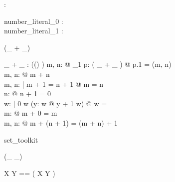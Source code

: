 \begin{axdef}
\nat : \power \arithmos
\end{axdef}

\begin{axdef}
  number\_literal\_0 : \nat\\
  number\_literal\_1 : \nat
\end{axdef}

\begin{zed}
 \leftassoc (\_ + \_)
\end{zed}

\begin{axdef}
\_ + \_ : \power ((\arithmos \cross \arithmos) \cross \arithmos)
\where
\forall m, n: \nat @ \exists_1 p: ( \_ + \_ ) @ p.1 = (m, n)\\
\forall m, n: \nat @ m + n \in \nat\\
\forall m, n: \nat | m + 1 = n + 1 @ m = n\\
\forall n: \nat @ \lnot n + 1 = 0\\
\forall w: \power \nat | 0 \in w \land (\forall y: w @ y + 1 \in w) @ w = \nat\\
\forall m: \nat @ m + 0 = m\\
\forall m, n: \nat @ m + (n + 1) = (m + n) + 1
\end{axdef}

\begin{zsection}
\SECTION set\_toolkit
\end{zsection}
\begin{zed}
 \rightassoc (\_ \rel \_)
\end{zed}

\begin{zed}
X \rel Y == \power ( X \cross Y )
\end{zed}

